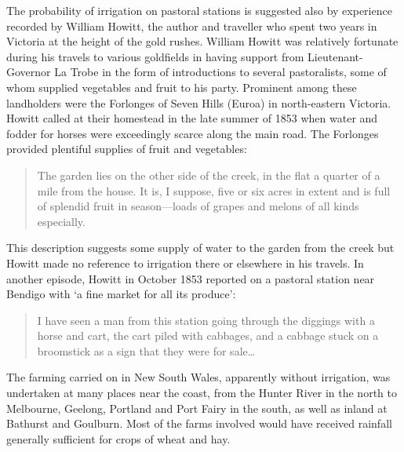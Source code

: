 The probability of irrigation on pastoral stations is suggested also
by experience recorded by William Howitt, the author and traveller who
spent two years in Victoria at the height of the gold rushes.  William
Howitt was relatively fortunate during his travels to various
goldfields in having support from Lieutenant-Governor La Trobe in the
form of introductions to several pastoralists, some of whom supplied
vegetables and fruit to his party.  Prominent among these landholders
were the Forlonges of Seven Hills (Euroa) in north-eastern Victoria.
Howitt called at their homestead in the late summer of 1853 when water
and fodder for horses were exceedingly scarce along the main
road.  The Forlonges provided plentiful supplies of fruit and
vegetables:
\begin{quote}
	The garden lies on the other side of the creek, in the flat a
	quarter of a mile from the house. It is, I suppose, five or
	six acres in extent and is full of splendid fruit in
	season---loads of grapes and melons of all kinds
	especially.
\end{quote}

This description suggests some supply of water to the garden from the
creek but Howitt made no reference to irrigation there or elsewhere in
his travels.  In another episode, Howitt in October 1853 reported on a
pastoral station near Bendigo with `a fine market for all its
produce':
\begin{quote}
	I have seen a man from this station going through the diggings
	with a horse and cart, the cart piled with cabbages, and a
	cabbage stuck on a broomstick as a sign that they were for
	sale\ldots{}
\end{quote}

The farming carried on in New South Wales, apparently without
irrigation, was undertaken at many places near the coast, from the
Hunter River in the north to Melbourne, Geelong, Portland and Port
Fairy in the south, as well as inland at Bathurst and Goulburn.  Most
of the farms involved would have received rainfall generally
sufficient for crops of wheat and hay.

